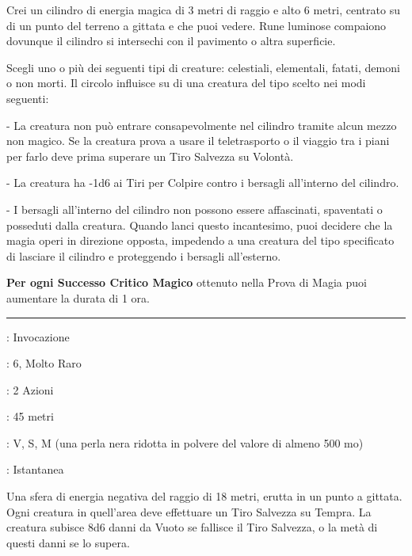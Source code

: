 \begin{multicols}{2}
Crei un cilindro di energia magica di 3 metri di raggio e alto 6 metri, centrato su di un punto del terreno a gittata e che puoi vedere. Rune luminose compaiono dovunque il cilindro si intersechi con il pavimento o altra superficie.

Scegli uno o più dei seguenti tipi di creature: celestiali, elementali, fatati, demoni o non morti. Il circolo influisce su di una creatura del tipo scelto nei modi seguenti:

\medskip

- La creatura non può entrare consapevolmente nel cilindro tramite alcun mezzo non magico. Se la creatura prova a usare il teletrasporto o il viaggio tra i piani per farlo deve prima superare un Tiro Salvezza su Volontà.

- La creatura ha -1d6 ai Tiri per Colpire contro i bersagli all'interno del cilindro.

- I bersagli all'interno del cilindro non possono essere affascinati, spaventati o posseduti dalla creatura. Quando lanci questo incantesimo, puoi decidere che la magia operi in direzione opposta, impedendo a una creatura del tipo specificato di lasciare il cilindro e proteggendo i bersagli all'esterno.

\textbf{Per ogni Successo Critico Magico} ottenuto nella Prova di Magia puoi aumentare la durata di 1 ora.

\smallskip\noindent\rule{\linewidth}{2pt} \hypertarget{Cerchio di Morte}{}\smallskip{}
\noindent
\begin{description}[noitemsep, topsep=0pt, parsep=0pt, partopsep=0pt, leftmargin=0cm, labelwidth=2.8cm]
	\item[\textbf{Lista di Magia}]: Invocazione
	\item[\textbf{Livello}]: 6, Molto Raro
	\item[\textbf{T. di Lancio}]: 2 Azioni
	\item[\textbf{Gittata}]: 45 metri
	\item[\textbf{Componenti}]: V, S, M (una perla nera ridotta in polvere del valore di almeno 500 mo)
	\item[\textbf{Durata}]: Istantanea
\end{description}

Una sfera di energia negativa del raggio di 18 metri, erutta in un punto a gittata. Ogni creatura in quell'area deve effettuare un Tiro Salvezza su Tempra. La creatura subisce 8d6 danni da Vuoto se fallisce il Tiro Salvezza, o la metà di questi danni se lo supera.


\end{multicols}
